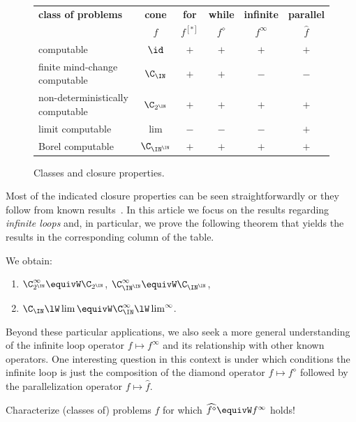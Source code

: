 \begin{figure}[htb]
\centering
\begin{tabular}{l|c|cccc}
{\bf class of problems} & {\bf cone} & {\bf for} & {\bf while} & {\bf infinite} & {\bf parallel}\\
& $f$ & $f^{[*]}$ & $f^\diamond$ & $f^\infty$ & $\widehat{f}$\\\hline
computable & $\id$ & $+$ & $+$ & $+$ & $+$ \\
finite mind-change computable & $\C_\IN$ & $+$ & $+$ & $-$ & $-$ \\
non-deterministically computable & $\C_{2^\IN}$ & $+$ & $+$ & $+$ & $+$ \\
limit computable & $\lim$ & $-$ & $-$ & $-$ & $+$ \\
Borel computable & $\C_{\IN^\IN}$ & $+$ & $+$ & $+$ & $+$
\end{tabular}
\caption{Classes and closure properties.}
\end{figure} 

\noindent
Most of the indicated closure properties can be seen straightforwardly or they follow from known results~\cite{BGP21}.
In this article we focus on the results regarding {\em infinite loops} and, in particular, we prove the following theorem
that yields the results in the corresponding column of the table.

\begin{thm}
\label{thm:infinite-loops}
We obtain:
\begin{enumerate}
\item $\C_{2^\IN}^\infty\equivW\C_{2^\IN}$, $\C_{\IN^\IN}^\infty\equivW\C_{\IN^\IN}$,
\item $\C_{\IN}\lW\lim\equivW\C_{\IN}^\infty\lW\lim^\infty$.
\end{enumerate}
\end{thm}

\noindent
Beyond these particular applications, we also seek a more general understanding of the infinite loop operator $f \mapsto f^\infty$ and its relationship with other known operators. One interesting question in this context is under
which conditions the infinite loop is just the composition of the diamond operator $f\mapsto f^\diamond$ 
followed by the parallelization operator $f\mapsto\widehat{f}$.

\begin{question}
\label{question}
Characterize (classes of) problems $f$ for which $\widehat{f^\diamond}\equivW f^\infty$ holds!
\end{question}

